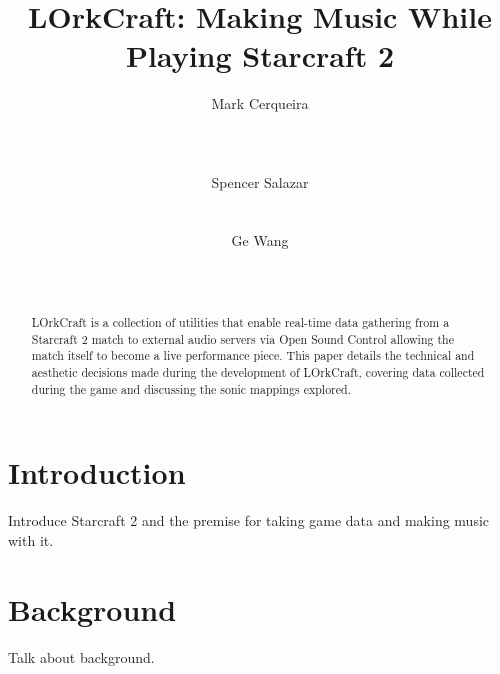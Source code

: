 \documentclass{nime-document-class}
\begin{document}

\newcommand{\projectName}{LOrkCraft}

\title{\projectName{}: Making Music While Playing Starcraft 2}

\author{
\alignauthor
Mark Cerqueira\\
       \\
       \\
       \\
\alignauthor
Spencer Salazar\\
       \\
       \\
\alignauthor
Ge Wang\\
       \\
       \\
}

\maketitle
\begin{abstract}
\projectName{} is a collection of utilities that enable real-time data gathering from a Starcraft 2 match to external audio servers via Open Sound Control allowing the match itself to become a live performance piece.
This paper details the technical and aesthetic decisions made during the development of \projectName{}, covering data collected during the game and discussing the sonic mappings explored.
\end{abstract}


\section{Introduction}
Introduce Starcraft 2 and the premise for taking game data and making music with it.

\section{Background}
Talk about background.
\end{document}
